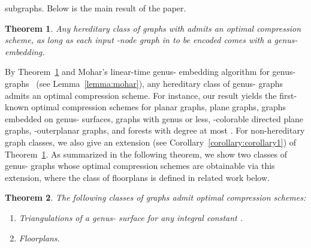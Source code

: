\documentclass[12pt]{article}
\newtheorem{theorem}{Theorem}[section]
\begin{document}
subgraphs.  Below is the main result of the paper.
\begin{theorem}
\label{theorem:theorem1}
Any hereditary class  of graphs with 
 admits an optimal compression scheme, as long
as each input -node graph in  to be encoded comes with a
genus- embedding.
\end{theorem}
\noindent
By Theorem~\ref{theorem:theorem1} and Mohar's linear-time genus-
embedding algorithm for genus- graphs~\cite{Mohar99,KawarabayashiMR08}
(see Lemma~\ref{lemma:mohar}), any hereditary class of genus-
graphs admits an optimal compression scheme.
For instance, our result yields the first-known optimal compression
schemes for planar graphs, plane graphs, graphs embedded on genus-
surfaces, graphs with genus  or less, -colorable directed plane
graphs, -outerplanar graphs, and forests with degree at most .
For non-hereditary graph classes, we also give an extension (see
Corollary~\ref{corollary:corollary1}) of
Theorem~\ref{theorem:theorem1}.  As summarized in the following
theorem, we show 
two classes of genus- graphs whose optimal
compression schemes are obtainable via this extension, where the class
of floorplans is defined in related work below.
\begin{theorem}
\label{theorem:theorem2}
The following
classes of graphs admit optimal compression schemes:
\begin{enumerate}
\addtolength{\itemsep}{-0.5\baselineskip}
\item
\label{thm2:triangulation}
Triangulations of a genus- surface for any integral constant .
\item 
\label{thm2:floorplan}
Floorplans.
\end{enumerate}
\end{theorem}
\end{document}
